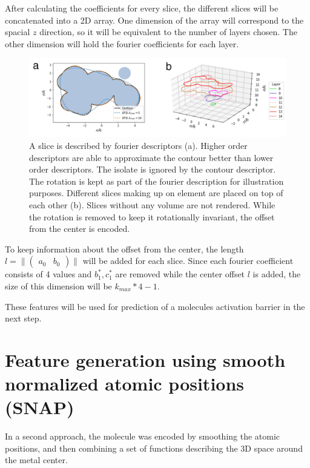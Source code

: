 After calculating the coefficients for every slice, the different slices will be concatenated into a 2D array.
One dimension of the array will correspond to the spacial $z$ direction, so it will be equivalent to the number of layers chosen.
The other dimension will hold the fourier coefficients for each layer.
\begin{figure}[H]
  \includegraphics[width=1.0\textwidth]{figures/fourier/snap-layered.png}
  \caption[Slices produced by LEFD encoder]{
  A slice is described by fourier descriptors (a). Higher order descriptors are able to approximate the contour better than lower order descriptors. 
  The isolate is ignored by the contour descriptor. The rotation is kept as part of the fourier description for illustration purposes.
  Different slices making up on element are placed on top of each other (b). Slices without any volume are not rendered. 
  While the rotation is removed to keep it rotationally invariant, the offset from the center is encoded.
  }
  \label{fig:slice-layered}
\end{figure}

To keep information about the offset from the center, the length $l = \| \begin{pmatrix} a_0 & b_0 \end{pmatrix} \| $ will be added for each slice.
Since each fourier coefficient consists of 4 values and $b_1^*, c_1^*$ are removed while the center offset $l$ is added, the size of this dimension will be $k_{max} * 4 - 1$.

These features will be used for prediction of a molecules activation barrier in the next step.


\newpage
\section{Feature generation using smooth normalized atomic positions (SNAP)}
\label{ch:SNAP}
In a second approach, the molecule was encoded by smoothing the atomic positions, 
and then combining a set of functions describing the 3D space around the metal center.

